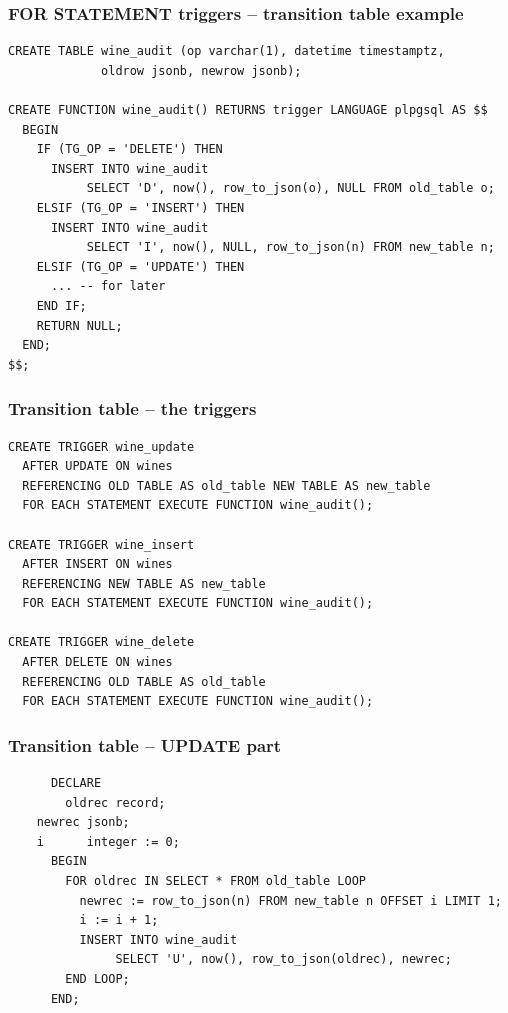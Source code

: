 \documentclass[ignorenonframetext,t]{beamer}
\begin{document}
\begin{frame}[fragile]
  \frametitle{FOR STATEMENT triggers -- transition table example}

  \begin{lstlisting}
CREATE TABLE wine_audit (op varchar(1), datetime timestamptz,
			 oldrow jsonb, newrow jsonb);

CREATE FUNCTION wine_audit() RETURNS trigger LANGUAGE plpgsql AS $$
  BEGIN
    IF (TG_OP = 'DELETE') THEN
      INSERT INTO wine_audit
           SELECT 'D', now(), row_to_json(o), NULL FROM old_table o;
    ELSIF (TG_OP = 'INSERT') THEN
      INSERT INTO wine_audit
           SELECT 'I', now(), NULL, row_to_json(n) FROM new_table n;
    ELSIF (TG_OP = 'UPDATE') THEN
      ... -- for later
    END IF;
    RETURN NULL;
  END;
$$;
  \end{lstlisting}

\end{frame}

\begin{frame}[fragile]
  \frametitle{Transition table -- the triggers}
  \begin{lstlisting}
CREATE TRIGGER wine_update
  AFTER UPDATE ON wines
  REFERENCING OLD TABLE AS old_table NEW TABLE AS new_table
  FOR EACH STATEMENT EXECUTE FUNCTION wine_audit();

CREATE TRIGGER wine_insert
  AFTER INSERT ON wines
  REFERENCING NEW TABLE AS new_table
  FOR EACH STATEMENT EXECUTE FUNCTION wine_audit();

CREATE TRIGGER wine_delete
  AFTER DELETE ON wines
  REFERENCING OLD TABLE AS old_table
  FOR EACH STATEMENT EXECUTE FUNCTION wine_audit();

  \end{lstlisting}
\end{frame}

\begin{frame}[fragile]
  \frametitle{Transition table -- UPDATE part}
  \begin{lstlisting}
      DECLARE
        oldrec record;
	newrec jsonb;
	i      integer := 0;
      BEGIN
        FOR oldrec IN SELECT * FROM old_table LOOP
          newrec := row_to_json(n) FROM new_table n OFFSET i LIMIT 1;
          i := i + 1;
          INSERT INTO wine_audit
               SELECT 'U', now(), row_to_json(oldrec), newrec;
        END LOOP;
      END;
  \end{lstlisting}
\end{frame}
\end{document}
